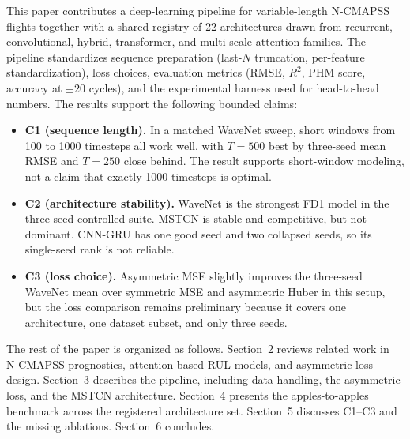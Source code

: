 This paper contributes a deep-learning pipeline for variable-length N-CMAPSS flights together with a shared registry of 22 architectures drawn from recurrent, convolutional, hybrid, transformer, and multi-scale attention families. The pipeline standardizes sequence preparation (last-$N$ truncation, per-feature standardization), loss choices, evaluation metrics (RMSE, $R^2$, PHM score, accuracy at $\pm 20$ cycles), and the experimental harness used for head-to-head numbers. The results support the following bounded claims:

\begin{itemize}
  \item \textbf{C1 (sequence length).} In a matched WaveNet sweep, short windows from 100 to 1000 timesteps all work well, with $T{=}500$ best by three-seed mean RMSE and $T{=}250$ close behind. The result supports short-window modeling, not a claim that exactly 1000 timesteps is optimal.
  \item \textbf{C2 (architecture stability).} WaveNet is the strongest FD1 model in the three-seed controlled suite. MSTCN is stable and competitive, but not dominant. CNN-GRU has one good seed and two collapsed seeds, so its single-seed rank is not reliable.
  \item \textbf{C3 (loss choice).} Asymmetric MSE slightly improves the three-seed WaveNet mean over symmetric MSE and asymmetric Huber in this setup, but the loss comparison remains preliminary because it covers one architecture, one dataset subset, and only three seeds.
\end{itemize}

The rest of the paper is organized as follows. Section~2 reviews related work in N-CMAPSS prognostics, attention-based RUL models, and asymmetric loss design. Section~3 describes the pipeline, including data handling, the asymmetric loss, and the MSTCN architecture. Section~4 presents the apples-to-apples benchmark across the registered architecture set. Section~5 discusses C1--C3 and the missing ablations. Section~6 concludes.
